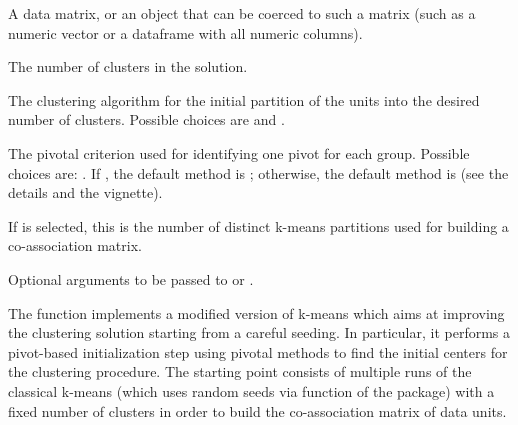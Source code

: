 \documentclass[a4paper]{book}
\begin{document}
%
\begin{Arguments}
\begin{ldescription}
\item[\code{x}] A  data matrix, or an object that can be coerced to such a matrix (such as a numeric vector or a dataframe with all numeric columns).

\item[\code{centers}] The number of clusters in the solution.

\item[\code{alg.type}] The clustering algorithm for the initial partition of the
 units into the desired number of clusters.
Possible choices are  and .

\item[\code{piv.criterion}] The pivotal criterion used for identifying one pivot
for each group. Possible choices are: .
If , the default method is ;
otherwise, the default method is  (see the details and
the vignette).

\item[\code{H}] If  is selected, this is the number of
distinct k-means partitions used for building a 
co-association matrix.

\item[\code{...}] Optional arguments to be passed to  or .
\end{ldescription}
\end{Arguments}
%
\begin{Details}\relax
The function implements a modified version of k-means which aims at
improving the clustering solution starting from a careful seeding.
In particular, it performs a pivot-based initialization step
using pivotal methods to find the initial centers
for the clustering procedure. The starting point consists of multiple
runs of the classical k-means (which uses random seeds via 
function of the  package)
with a fixed number of clusters
in order to build the co-association matrix of data units.
\end{Details}
%
\end{document}
